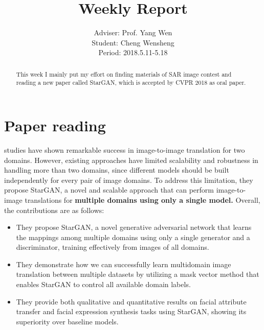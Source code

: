 \documentclass[]{IEEEtran}
\begin{document}
	\title{Weekly Report}
	\author{Adviser: Prof. Yang Wen \\Student: Cheng Wensheng\\ Period: 2018.5.11-5.18
	}
	\maketitle

\begin{abstract}
	This week I mainly put my effort on finding materials of SAR image contest and reading a new paper called StarGAN, which is accepted by CVPR 2018 as oral paper. 
\end{abstract}

\section{Paper reading}
	 studies have shown remarkable success in image-to-image translation for two domains. However, existing approaches have limited scalability and robustness in handling more than two domains, since different models should
	be built independently for every pair of image domains. To
	address this limitation, they propose StarGAN, a novel and
	scalable approach that can perform image-to-image translations
	for \textbf{multiple domains using only a single model.} Overall, the contributions are as follows:
	\begin{itemize}
		\item They propose StarGAN, a novel generative adversarial
		network that learns the mappings among multiple domains	using only a single generator and a discriminator, training effectively from images of all domains.
		\item They demonstrate how we can successfully learn multidomain	image translation between multiple datasets by utilizing a mask vector method that enables StarGAN
		to control all available domain labels.
		\item They provide both qualitative and quantitative results on facial attribute transfer and facial expression synthesis tasks using StarGAN, showing its superiority over
		baseline models.
	\end{itemize}
\end{document}
